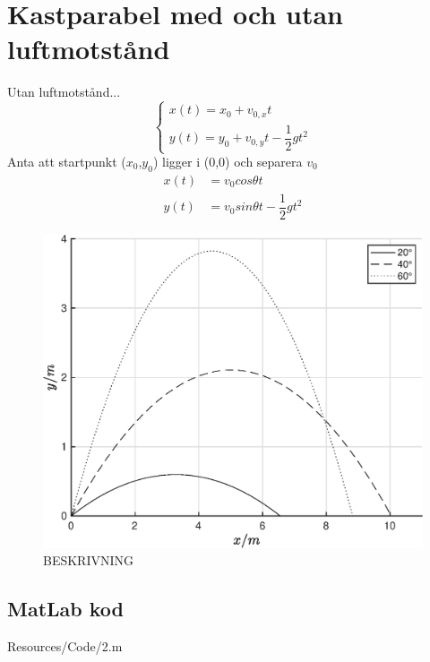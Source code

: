 \section*{\centering Kastparabel med och utan luftmotstånd}

Utan luftmotstånd...
\begin{equation} \label{eq:xyt}
    \begin{cases}
        x(t) = x_0 + v_{0,x}t \\
        y(t) = y_0 + v_{0,y}t - \dfrac{1}{2}gt^2
    \end{cases}
\end{equation}
Anta att startpunkt ($x_0$,$y_0$) ligger i (0,0) och separera $v_0$ 
\begin{align}
    x(t) &= v_0cos\theta t \label{eq:xt}\\
    y(t) &= v_0sin\theta t - \dfrac{1}{2}gt^2 \label{eq:yt}
\end{align}

\begin{figure}[H]
    \centering
    \captionsetup{justification=centering,margin=2cm}
    \includegraphics[scale=0.5]{Resources/Graphics/fig2_1.eps}
    \caption{BESKRIVNING}
    \label{fig:2_1}
\end{figure}

\np
\subsection*{MatLab kod}
 {Resources/Code/2.m}